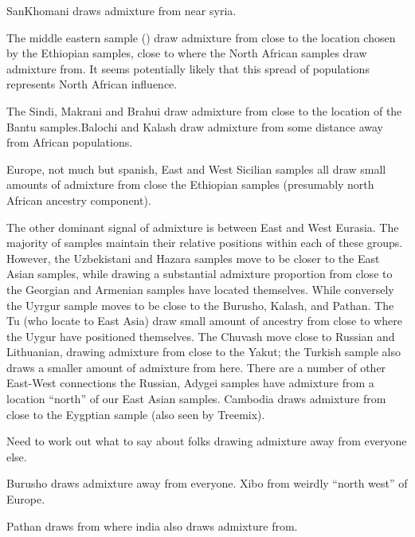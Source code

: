 \documentclass[12pt]{article}
\begin{document}
SanKhomani draws admixture from near syria.

The middle eastern sample () draw admixture from close to the location chosen by the Ethiopian samples, close to where the North African samples draw admixture from. It seems potentially likely that this spread of populations represents North African influence. 

The Sindi, Makrani and Brahui draw admixture from close to the location of the Bantu samples.Balochi and Kalash draw admixture from some distance away from African populations.

Europe, not much but spanish, East and West Sicilian samples all draw small amounts of admixture from close the Ethiopian samples (presumably north African ancestry component). 

The other dominant signal of admixture is between East and West Eurasia. The majority of samples maintain their relative positions within each of these groups. However, the Uzbekistani and Hazara samples move to be closer to the East Asian samples, while drawing a substantial admixture proportion from close to the Georgian and Armenian samples have located themselves. While conversely the  Uyrgur sample moves to be close to the Burusho, Kalash, and Pathan. The Tu (who locate to East Asia) draw small amount of ancestry from close to where the Uygur have positioned themselves.
The Chuvash move close to Russian and Lithuanian, drawing admixture from close to the Yakut; the Turkish sample also draws a smaller amount of admixture from here. There are a number of other East-West connections the Russian, Adygei samples have admixture from a location ``north'' of our East Asian samples.  Cambodia draws admixture from close to the Eygptian sample (also seen by Treemix). 


Need to work out what to say about folks drawing admixture away from everyone else.

Burusho draws admixture away from everyone.
Xibo from weirdly ``north west'' of Europe.  

Pathan draws from where india also draws admixture from.
\end{document}
